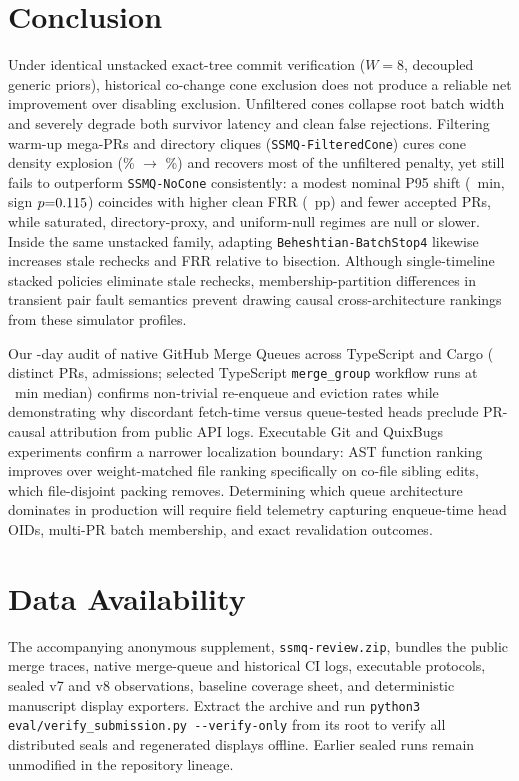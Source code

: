\section{Conclusion}
\label{sec:conclusion}
Under identical unstacked exact-tree commit verification ($W{=}8$, decoupled generic priors), historical co-change cone exclusion does not produce a reliable net improvement over disabling exclusion. Unfiltered cones collapse root batch width and severely degrade both survivor latency and clean false rejections. Filtering warm-up mega-PRs and directory cliques (\texttt{SSMQ-FilteredCone}) cures cone density explosion (\UnfDensity{}\% $\to$ \FcDensity{}\%) and recovers most of the unfiltered penalty, yet still fails to outperform \texttt{SSMQ-NoCone} consistently: a modest nominal P95 shift (\FcNomDeltaP{}~min, sign $p{=}0.115{}$) coincides with higher clean FRR (\FcNomDeltaFrr{}~pp) and fewer accepted PRs, while saturated, directory-proxy, and uniform-null regimes are null or slower. Inside the same unstacked family, adapting \texttt{Beheshtian-BatchStop4} likewise increases stale rechecks and FRR relative to bisection. Although single-timeline stacked policies eliminate stale rechecks, membership-partition differences in transient pair fault semantics prevent drawing causal cross-architecture rankings from these simulator profiles.

Our \ObsDays{}-day audit of native GitHub Merge Queues across TypeScript and Cargo (\ObsDistinctPrs{} distinct PRs, \ObsAdmissions{} admissions; \ObsTsWfSelected{} selected TypeScript \texttt{merge\_group} workflow runs at \ObsTsWfP{}~min median) confirms non-trivial re-enqueue and eviction rates while demonstrating why discordant fetch-time versus queue-tested heads preclude PR-causal attribution from public API logs. Executable Git and QuixBugs experiments confirm a narrower localization boundary: AST function ranking improves over weight-matched file ranking specifically on co-file sibling edits, which file-disjoint packing removes. Determining which queue architecture dominates in production will require field telemetry capturing enqueue-time head OIDs, multi-PR batch membership, and exact revalidation outcomes.

\section*{Data Availability}
The accompanying anonymous supplement, \texttt{ssmq-review.zip}, bundles the public merge traces, native merge-queue and historical CI logs, executable protocols, sealed v7 and v8 observations, baseline coverage sheet, and deterministic manuscript display exporters. Extract the archive and run \texttt{python3 eval/verify\_submission.py {-}{-}verify-only} from its root to verify all distributed seals and regenerated displays offline. Earlier sealed runs remain unmodified in the repository lineage.
